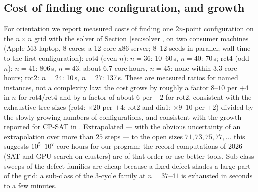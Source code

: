 \documentclass[11pt]{article}
\theoremstyle{remark}
\begin{document}
\subsection{Cost of finding one configuration, and growth}
For orientation we report measured costs of finding one $2n$-point configuration on the $n\times n$ grid with the solver of
Section~\ref{sec:solver}, on two consumer machines (Apple M3 laptop, 8 cores; a 12-core x86 server; 8--12 seeds in parallel;
wall time to the first configuration):
rot4 (even $n$): $n=36$: 10--60\,s, $n=40$: 70\,s; rct4 (odd $n$): $n=41$: 806\,s, $n=43$: about 6.7 core-hours,
$n=45$: none within 3.3 core-hours; rot2: $n=24$: 10\,s, $n=27$: 137\,s.  These are measured ratios for named
instances, not a complexity law: the cost grows by roughly a factor $8$--$10$ per $+4$ in $n$ for rot4/rct4 and by a factor
of about $6$ per $+2$ for rot2, consistent with the exhaustive tree sizes (rot4: $\times20$ per $+4$; rot2 and dia1:
$\times9$--$10$ per $+2$) divided by the slowly growing numbers of configurations, and consistent with the growth reported for
CP-SAT in \cite{Prellberg26}.  Extrapolated --- with the obvious uncertainty of an extrapolation over more than $25$ steps ---
to the open sizes $71,73,75,77,\dots$ this suggests $10^5$--$10^7$ core-hours for our program; the record computations of 2026
(SAT and GPU search on clusters) are of that order or use better tools.  Sub-class sweeps of the defect families are cheap
because a fixed defect shades a large part of the grid: a sub-class of the $3$-cycle family at $n=37$--$41$ is exhausted in
seconds to a few minutes.
\end{document}
